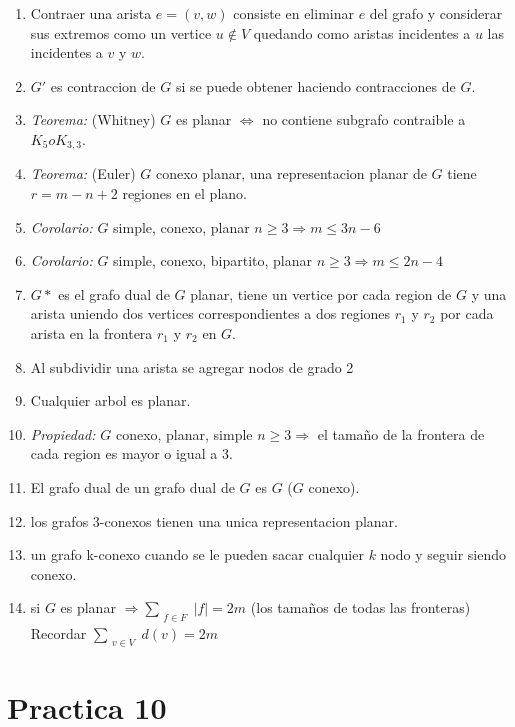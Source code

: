 \documentclass[a4paper, 11pt]{article}
\begin{document}
\begin{enumerate}
\item Contraer una arista $e=(v,w)$ consiste en eliminar $e$ del grafo y considerar sus extremos como un vertice $u \notin V$ quedando como aristas incidentes a $u$ las incidentes a $v$ y $w$.
\item $G'$ es contraccion de $G$ si se puede obtener haciendo contracciones de $G$.
\item \textit{Teorema:} (Whitney) $G$ es planar $\iff$ no contiene subgrafo contraible a $K_{5} o K_{3,3}$.
\item \textit{Teorema:} (Euler) $G$ conexo planar, una representacion planar de $G$ tiene $r=m-n+2$ regiones en el plano.
\item \textit{Corolario:} $G$ simple, conexo, planar $n \geq 3 \Rightarrow m \leq 3n-6$
\item \textit{Corolario:} $G$ simple, conexo, bipartito, planar $n \geq 3 \Rightarrow m \leq 2n-4$
\item $G*$ es el grafo dual de $G$ planar, tiene un vertice por cada region de $G$ y una arista uniendo dos vertices correspondientes a dos regiones $r_{1}$ y $r_{2}$ por cada arista en la frontera $r_{1}$ y $r_{2}$ en $G$.
\item Al subdividir una arista se agregar nodos de grado 2
\item Cualquier arbol es planar.
\item \textit{Propiedad:} $G$ conexo, planar, simple $n \geq 3 \Rightarrow$ el tamaño de la frontera de cada region es mayor o igual a $3$.
\item El grafo dual de un grafo dual de $G$ es $G$ ($G$ conexo).
\item los grafos 3-conexos tienen una unica representacion planar.
\item un grafo k-conexo cuando se le pueden sacar cualquier $k$ nodo y seguir siendo conexo.
\item si $G$ es planar $\Rightarrow \sum_{\substack{f \in F}}|f| = 2m$ (los tamaños de todas las fronteras) Recordar $\sum_{\substack{v \in V}}d(v) = 2m$ 
\end{enumerate}

\section{Practica 10}
\end{document}
